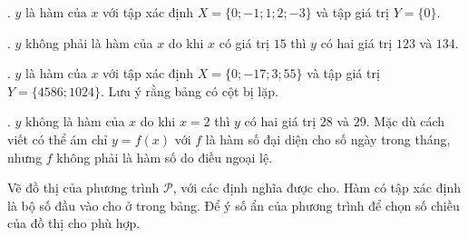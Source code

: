 . $y$ là hàm của $x$ với tập xác định $X = \{0; -1; 1; 2; -3\}$ và tập giá trị $Y = \{0\}$.

. $y$ không phải là hàm của $x$ do khi $x$ có giá trị $15$ thì $y$ có hai giá trị $123$ và $134$.

. $y$ là hàm của $x$ với tập xác định $X = \{0; -17; 3; 55\}$ và tập giá trị $Y = \{4586; 1024\}$. Lưu ý rằng bảng có cột bị lặp.

. $y$ không là hàm của $x$ do khi $x = 2$ thì $y$ có hai giá trị $28$ và $29$. Mặc dù cách viết có thể ám chỉ $y=f(x)$ với $f$ là hàm số đại diện cho số ngày trong tháng, nhưng $f$ không phải là hàm số do điều ngoại lệ.

 Vẽ đồ thị của phương trình $\mathcal{P}$, với các định nghĩa được cho. Hàm có tập xác định là bộ số đầu vào cho ở trong bảng. Để ý số ẩn của phương trình để chọn số chiều của đồ thị cho phù hợp.

